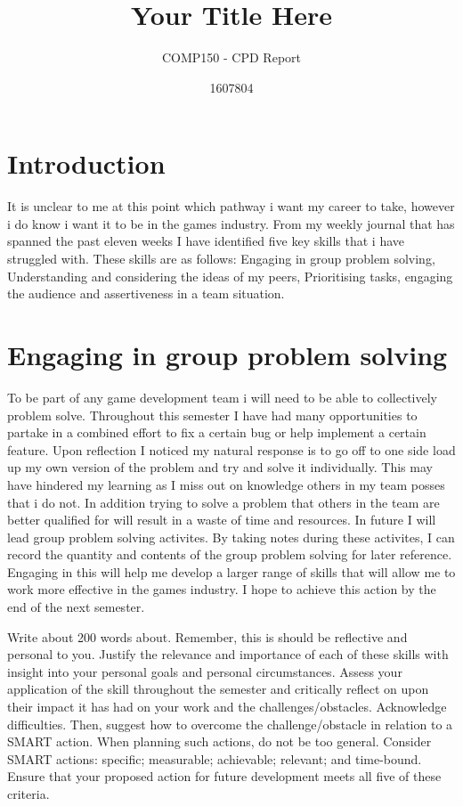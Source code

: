 \documentclass{scrartcl}
\title{Your Title Here}
\subtitle{COMP150 - CPD Report}
\author{1607804}
\begin{document}
\maketitle

\section{Introduction}
It is unclear to me at this point which pathway i want my career to take, however i do know i want it to be in the games industry.  From my weekly journal that has spanned the past eleven weeks I have identified five key skills that i have struggled with. These skills are as follows: Engaging in group problem solving, Understanding and considering the ideas of my peers, Prioritising tasks, engaging the audience and assertiveness in a team situation.


\section{Engaging in group problem solving}
To be part of any game development team i will need to be able to collectively problem solve. Throughout this semester I have had many opportunities to partake in a combined effort to fix a certain bug or help implement a certain feature. Upon reflection I noticed my natural response is to go off to one side load up my own version of the problem and try and solve it individually. This may have hindered my learning as I miss out on knowledge others in my team posses that i do not. In addition trying to solve a problem that others in the team are better qualified for will result in a waste of time and resources. In future I will lead group problem solving activites. By taking notes during these activites, I can record the quantity and contents of the group problem solving for later reference. Engaging in this will help me develop a larger range of skills that will allow me to work more effective in the games industry. I hope to achieve this action by the end of the next semester.

Write about 200 words about. Remember, this is should be reflective and personal to you. Justify the relevance and importance of each of these skills with insight into your personal goals and personal circumstances. Assess your application of the skill throughout the semester and critically reflect on upon their impact it has had on your work and the challenges/obstacles. Acknowledge difficulties. Then, suggest how to overcome the challenge/obstacle in relation to a SMART action. When planning such actions, do not be too general. Consider SMART actions:
specific; measurable; achievable; relevant; and time-bound. Ensure that your proposed action for future development meets all five of these criteria.
\end{document}
